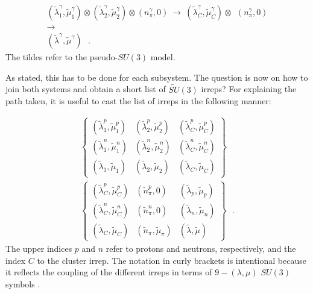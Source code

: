 \documentclass[12pt]{article}
\newcommand{\beqa}{\begin{eqnarray}}
\newcommand{\eeqa}{\end{eqnarray}}
\begin{document}
\beqa
&
\left( {\tilde \lambda}^\gamma_1, {\tilde \mu}^\gamma_1\right)
\otimes
\left( {\tilde \lambda}^\gamma_2, {\tilde \mu}^\gamma_2\right)
\otimes
\left( n^\gamma_\pi , 0\right)
~ \rightarrow ~
\left( {\tilde \lambda}^\gamma_C, {\tilde \mu}^\gamma_C\right)
\otimes
~~\left( n^\gamma_\pi , 0\right)
&
\nonumber \\
& \rightarrow &
\nonumber \\
& 
\left({\tilde \lambda}^\gamma ,{\tilde \mu}^\gamma \right) 
~~~.
&
\label{sub1}
\eeqa
The tildes refer to the pseudo-$SU(3)$ model.

As stated, this has to be done for each subsystem.
The question is now on how to join both systems and obtain a short list of $\widetilde{SU}(3)$
irreps? For explaining the path taken, it is useful to cast the list of irreps
in the following manner:

\beqa
&
\left\{
\begin{array}{ccc}
\left( {\tilde \lambda}^p_1, {\tilde \mu}^p_1\right) &
\left( {\tilde \lambda}^p_2, {\tilde \mu}^p_2\right) &
\left( {\tilde \lambda}^p_{C}, {\tilde \mu}^p_{C}\right) \\
\left( {\tilde \lambda}^n_1, {\tilde \mu}^n_1\right) &
\left( {\tilde \lambda}^n_2, {\tilde \mu}^n_2\right) &
\left( {\tilde \lambda}^n_{C}, {\tilde \mu}^n_{C}\right) \\
\left( {\tilde \lambda}_1, {\tilde \mu}_1\right) &
\left( {\tilde \lambda}_2, {\tilde \mu}_2\right) &
\left( {\tilde \lambda}_{C}, {\tilde \mu}_{C}\right) 
\end{array}
\right\}
&
\nonumber \\
&
\left\{
\begin{array}{ccc}
\left( {\tilde \lambda}^p_{C}, {\tilde \mu}^p_{C}\right) &
\left( {\tilde n}^p_\pi, 0\right) &
\left( {\tilde \lambda}_{p}, {\tilde \mu}_{p}\right) \\
\left( {\tilde \lambda}^n_{C}, {\tilde \mu}^n_{C}\right) &
\left( {\tilde n}^n_\pi, 0\right) &
\left( {\tilde \lambda}_{n}, {\tilde \mu}_{n}\right) \\
\left( {\tilde \lambda}_C, {\tilde \mu}_C \right) &
\left( {\tilde n}_\pi, {\tilde \mu}_\pi\right) &
\left( {\tilde \lambda}, {\tilde \mu}\right) 
\end{array}
\right\}
~~~.
&
\label{sub2}
\eeqa
The upper indices $p$ and $n$ refer to 
protons and neutrons, respectively, and the index $C$ to the cluster irrep. 
The notation in curly
brackets is intentional because it reflects the coupling of the different irreps in terms
of $9-\left(\lambda , \mu\right)$ $SU(3)$ symbols \cite{escher}. 
\end{document}
